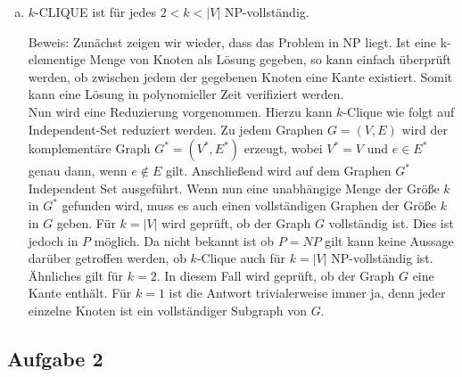 \documentclass[12pt,a4paper]{article}
\begin{document}
\begin{enumerate}[a)]
	\item $k$-CLIQUE ist für jedes $2 < k < |V|$ NP-vollständig. 
	
	Beweis: Zunächst zeigen wir wieder, dass das Problem in NP liegt. Ist eine k-elementige Menge von Knoten als Lösung gegeben, so kann einfach überprüft werden, ob zwischen jedem der gegebenen Knoten eine Kante existiert. Somit kann eine Lösung in polynomieller Zeit verifiziert werden.\\
	Nun wird eine Reduzierung vorgenommen. Hierzu kann $k$-Clique wie folgt auf Independent-Set reduziert werden. Zu jedem Graphen $G=(V,E)$ wird der komplementäre Graph $G^*=(V^*,E^*)$ erzeugt, wobei $V^*=V$ und $e \in E^*$ genau dann, wenn $e \notin E$ gilt. Anschließend wird auf dem Graphen $G^*$ Independent Set ausgeführt. Wenn nun eine unabhängige Menge der Größe $k$ in $G^*$ gefunden wird, muss es auch einen vollständigen Graphen der Größe $k$ in $G$ geben.
	Für $k=|V|$ wird geprüft, ob der Graph $G$ vollständig ist. Dies ist jedoch in $P$ möglich. Da nicht bekannt ist ob $P=NP$ gilt kann keine Aussage darüber getroffen werden, ob $k$-Clique auch für $k=|V|$ NP-vollständig ist. Ähnliches gilt für $k=2$. In diesem Fall wird geprüft, ob der Graph $G$ eine Kante enthält.
	Für $k=1$ ist die Antwort trivialerweise immer ja, denn jeder einzelne Knoten ist ein vollständiger Subgraph von $G$.

\end{enumerate}

\subsection*{Aufgabe 2}
\end{document}
